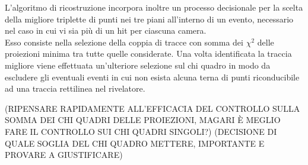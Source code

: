 \documentclass[8pt]{extarticle}
\begin{document}
L’algoritmo di ricostruzione incorpora inoltre un processo decisionale per la scelta della migliore triplette di punti nei tre piani all'interno di un evento, necessario nel caso in cui vi sia più di un hit per ciascuna camera. \\ 
Esso consiste nella selezione della coppia di tracce con somma dei $\chi^2$ delle proiezioni minima tra tutte quelle considerate. Una volta identificata la traccia migliore viene effettuata un'ulteriore selezione sul chi quadro in modo da escludere gli eventuali eventi in cui non esista alcuna terna di punti riconducibile ad una traccia rettilinea nel rivelatore.

(RIPENSARE RAPIDAMENTE ALL'EFFICACIA DEL CONTROLLO SULLA SOMMA DEI CHI QUADRI DELLE PROIEZIONI, MAGARI È MEGLIO FARE IL CONTROLLO SUI CHI QUADRI SINGOLI?)
(DECISIONE DI QUALE SOGLIA DEL CHI QUADRO METTERE, IMPORTANTE E PROVARE A GIUSTIFICARE)\\
\end{document}
